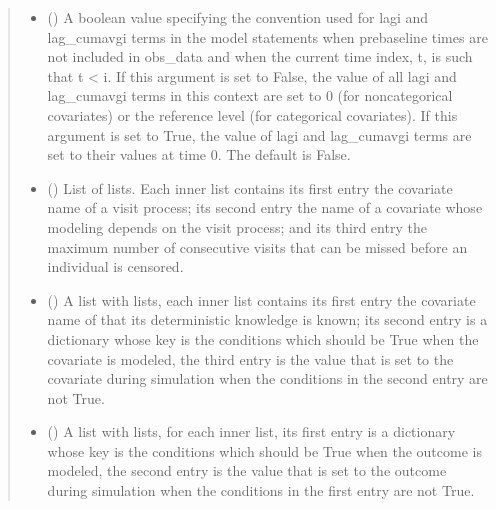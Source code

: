 \documentclass[letterpaper,10pt,english]{sphinxmanual}
\begin{document}
\begin{fulllineitems}
\begin{quote}
\begin{description}
\begin{itemize}
\item {} 
\sphinxAtStartPar
{} (\sphinxstyleliteralemphasis{\sphinxupquote{, }}) \textendash{} A boolean value specifying the convention used for lagi and lag\_cumavgi terms in the model statements when
pre\sphinxhyphen{}baseline times are not included in obs\_data and when the current time index, t, is such that t \textless{} i. If this
argument is set to False, the value of all lagi and lag\_cumavgi terms in this context are set to 0 (for
non\sphinxhyphen{}categorical covariates) or the reference level (for categorical covariates). If this argument is set to
True, the value of lagi and lag\_cumavgi terms are set to their values at time 0. The default is False.

\item {} 
\sphinxAtStartPar
{} (\sphinxstyleliteralemphasis{\sphinxupquote{, }}) \textendash{} List of lists. Each inner list contains its first entry the covariate name of a visit process; its second entry
the name of a covariate whose modeling depends on the visit process; and its third entry the maximum number
of consecutive visits that can be missed before an individual is censored.

\item {} 
\sphinxAtStartPar
{} (\sphinxstyleliteralemphasis{\sphinxupquote{, }}) \textendash{} A list with lists, each inner list contains its first entry the covariate name of that its deterministic knowledge
is known; its second entry is a dictionary whose key is the conditions which should be True when the covariate
is modeled, the third entry is the value that is set to the covariate during simulation when the conditions
in the second entry are not True.

\item {} 
\sphinxAtStartPar
{} (\sphinxstyleliteralemphasis{\sphinxupquote{, }}) \textendash{} A list with lists, for each inner list, its first entry is a dictionary whose key is the conditions which
should be True when the outcome is modeled, the second entry is the value that is set to the outcome during
simulation when the conditions in the first entry are not True.


\end{itemize}
\end{description}
\end{quote}
\end{fulllineitems}
\end{document}
